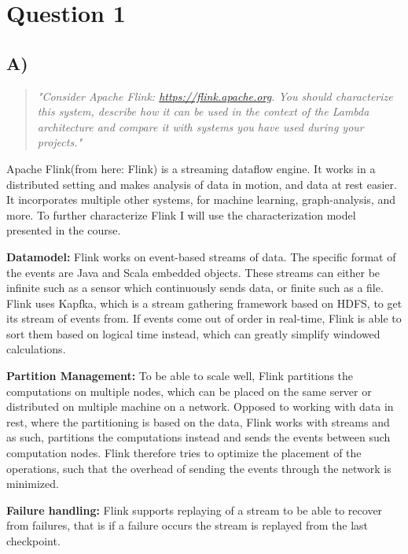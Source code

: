 \section{Question 1}

\subsection{A)}
\begin{quote}
	\textit{"Consider	Apache	Flink: \url{https://flink.apache.org}.	You	should	characterize	this	system,	describe	how	it	can	be	used	in	the	context	of	the	Lambda	architecture	and	compare	it	with	systems	you	have	used	during	your	projects."}
\end{quote}

\newpar Apache Flink(from here: Flink) is a streaming dataflow engine. It works in a distributed setting and makes analysis of data in motion, and data at rest easier. It incorporates multiple other systems, for machine learning, graph-analysis, and more. To further characterize Flink I will use the characterization model presented in the course.

\newpar \textbf{Datamodel:} Flink works on event-based streams of data. The specific format of the events are Java and Scala embedded objects. These streams can either be infinite such as a sensor which continuously sends data, or finite such as a file. Flink uses Kapfka, which is a stream gathering framework based on HDFS, to get its stream of events from\cite{confluent-flink}. If events come out of order in real-time, Flink is able to sort them based on logical time instead, which can greatly simplify windowed calculations.

\newpar \textbf{Partition Management:} To be able to scale well, Flink partitions the computations on multiple nodes, which can be placed on the same server or distributed on multiple machine on a network. Opposed to working with data in rest, where the partitioning is based on the data, Flink works with streams and as such, partitions the computations instead and sends the events between such computation nodes. Flink therefore tries to optimize the placement of the operations, such that the overhead of sending the events through the network is minimized\cite{official-flink}.

\newpar \textbf{Failure handling:} Flink supports replaying of a stream to be able to recover from failures, that is if a failure occurs the stream is replayed from the last checkpoint.

